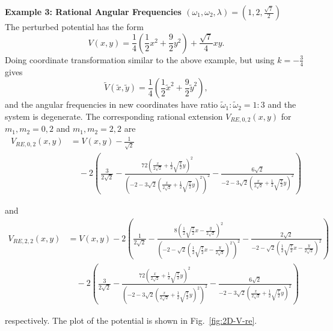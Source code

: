 \documentclass[a4paper, 12pt]{article}
\newcommand{\td}[1]{\tilde{#1}}
\begin{document}
{\bf Example 3: Rational Angular Frequencies \((\omega_1, \omega_2, \lambda) = \left(1, 2, \frac{\sqrt{7}}{2}\right)\)}\\

The perturbed potential has the form
\begin{equation}\label{img-example-2D}
  V(x,y)= \frac{1}{4}\left(\frac{1}{2}x^2+\frac{9}{2}y^2\right)+ \frac{\sqrt{7}}{4} xy.
\end{equation}
Doing coordinate transformation similar to the above example, but using  $k=-\frac{3}{4}$ gives
\[\tilde{V}(\td{x},\td{y})=\frac{1}{4} \left(\frac{1}{2} \td{x}^2+\frac{9}{2}\td{y}^2\right),\]
and the angular frequencies in new coordinates have ratio $\td{\omega}_1:\td{\omega}_2=1:3$ and the system is degenerate. The corresponding rational extension \( V_{RE,0,2}(x, y) \) for \( m_1, m_2 = 0, 2 \) and \( m_1, m_2 = 2, 2 \) are
\begin{align*}
  V_{RE,0,2}(x, y) &=V(x,y) -\frac{1}{\sqrt{2}} \\
  &\quad - 2 \left( \frac{3}{2\sqrt{2}} 
  - \frac{72 \left( \frac{x}{2\sqrt{2}} + \frac{1}{2} \sqrt{\frac{7}{2}} y \right)^2}
         {\left( -2 - 3\sqrt{2} \left( \frac{x}{2\sqrt{2}} + \frac{1}{2} \sqrt{\frac{7}{2}} y \right)^2 \right)^2} 
  - \frac{6\sqrt{2}}
         {-2 - 3\sqrt{2} \left( \frac{x}{2\sqrt{2}} + \frac{1}{2} \sqrt{\frac{7}{2}} y \right)^2} \right)
\end{align*}

and
\begin{align*}
  V_{RE,2,2}(x, y) &= V(x,y)-2 \left( \frac{1}{2\sqrt{2}} 
  - \frac{8 \left( \frac{1}{2} \sqrt{\frac{7}{2}} x - \frac{y}{2\sqrt{2}} \right)^2}
         {\left( -2 - \sqrt{2} \left( \frac{1}{2} \sqrt{\frac{7}{2}} x - \frac{y}{2\sqrt{2}} \right)^2 \right)^2} 
  - \frac{2\sqrt{2}}
         {-2 - \sqrt{2} \left( \frac{1}{2} \sqrt{\frac{7}{2}} x - \frac{y}{2\sqrt{2}} \right)^2} \right) \\
  &\quad - 2 \left( \frac{3}{2\sqrt{2}} 
  - \frac{72 \left( \frac{x}{2\sqrt{2}} + \frac{1}{2} \sqrt{\frac{7}{2}} y \right)^2}
         {\left( -2 - 3\sqrt{2} \left( \frac{x}{2\sqrt{2}} + \frac{1}{2} \sqrt{\frac{7}{2}} y \right)^2 \right)^2} 
  - \frac{6\sqrt{2}}
         {-2 - 3\sqrt{2} \left( \frac{x}{2\sqrt{2}} + \frac{1}{2} \sqrt{\frac{7}{2}} y \right)^2} \right)
\end{align*}

respectively. The plot of the potential is shown in Fig.~\ref{fig:2D-V-re}.
\end{document}
